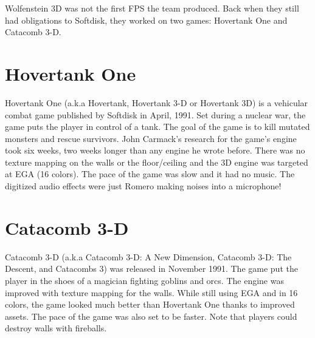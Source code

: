 Wolfenstein 3D was not the first FPS the team produced. Back when they still had obligations to Softdisk, they worked on two games: Hovertank One and Catacomb 3-D.\\
\par
\section{Hovertank One}
Hovertank One	 (a.k.a Hovertank, Hovertank 3-D or Hovertank 3D) is a vehicular combat game published by Softdisk in April, 1991. Set during a nuclear war, the game puts the player in control of a tank. The goal of the game is to kill mutated monsters and rescue survivors. John Carmack's research for the game's engine took six weeks, two weeks longer than any engine he wrote before. There was no texture mapping on the walls or the floor/ceiling and the 3D engine was targeted at EGA (16 colors). The pace of the game was slow and it had no music. The digitized audio effects were just Romero making noises into a microphone! \\
\par

\section{Catacomb 3-D}
Catacomb 3-D (a.k.a Catacomb 3-D: A New Dimension, Catacomb 3-D: The Descent, and Catacombs 3) was released in November 1991. The game put the player in the shoes of a magician fighting goblins and orcs. The engine was improved with texture mapping for the walls. While still using EGA and in 16 colors, the game looked much better than Hovertank One thanks to improved assets. The pace of the game was also set to be faster. Note that players could destroy walls with fireballs.\\
\par
\begin{minipage}{\textwidth}
\label{hovertank3d_screenshot}
\begin{figure}[H]
\centering
{}
\end{figure}

\begin{figure}[H]
\centering
{}
\end{figure}
\end{minipage}


\begin{minipage}{\textwidth}
\label{catacomb3d_screenshot}
\begin{figure}[H]
\centering
{}
\end{figure}

\begin{figure}[H]
\centering
{}
\end{figure}
\end{minipage}

